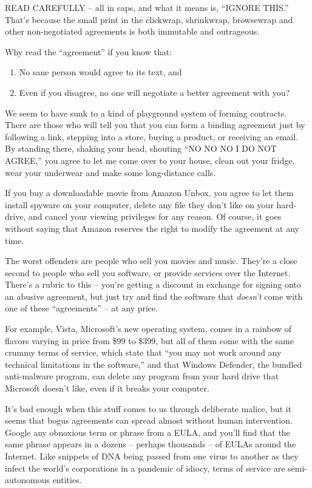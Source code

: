 READ CAREFULLY -- all in caps, and what it means is, ``IGNORE THIS.''
That's because the small print in the clickwrap, shrinkwrap,
browsewrap and other non-negotiated agreements is both immutable
and outrageous.

Why read the ``agreement'' if you know that:
\begin{enumerate}
  \item No sane person would agree to its text, and
  \item Even if you disagree, no one will negotiate a better agreement
    with you?
\end{enumerate}

We seem to have sunk to a kind of playground system of forming
contracts. There are those who will tell you that you can form a
binding agreement just by following a link, stepping into a store,
buying a product, or receiving an email. By standing there, shaking
your head, shouting ``NO NO NO I DO NOT AGREE,'' you agree to let me
come over to your house, clean out your fridge, wear your underwear
and make some long-distance calls.

If you buy a downloadable movie from Amazon Unbox, you agree to let
them install spyware on your computer, delete any file they don't
like on your hard-drive, and cancel your viewing privileges for any
reason. Of course, it goes without saying that Amazon reserves the
right to modify the agreement at any time.

The worst offenders are people who sell you movies and music.
They're a close second to people who sell you software, or provide
services over the Internet. There's a rubric to this -- you're
getting a discount in exchange for signing onto an abusive
agreement, but just try and find the software that \emph{doesn't}
come with one of these ``agreements'' -- at any price.

For example, Vista, Microsoft's new operating system, comes in a
rainbow of flavors varying in price from \$99 to \$399, but all of
them come with the same crummy terms of service, which state that
``you may not work around any technical limitations in the
software,'' and that Windows Defender, the bundled anti-malware
program, can delete any program from your hard drive that Microsoft
doesn't like, even if it breaks your computer.

It's bad enough when this stuff comes to us through deliberate
malice, but it seems that bogus agreements can spread almost
without human intervention. Google any obnoxious term or phrase
from a EULA, and you'll find that the same phrase appears in a
dozens -- perhaps thousands -- of EULAs around the Internet. Like
snippets of DNA being passed from one virus to another as they
infect the world's corporations in a pandemic of idiocy, terms of
service are semi-autonomous entities.

